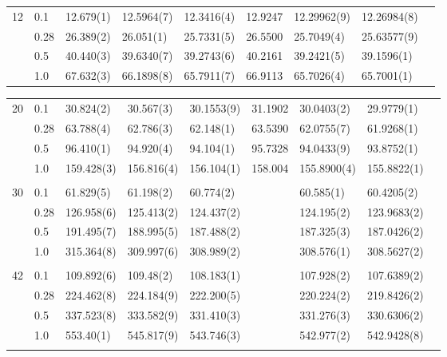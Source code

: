 {\begin{landscape}
\begin{table}
\begin{tabularx}{\hsize}{llR{2.65cm}R{2.65cm}R{2.65cm}R{2.65cm}R{2.65cm}R{2.65cm}R{2.65cm}}
				12 & 0.1 & 12.679(1) & 12.5964(7) & 12.3416(4) & 12.9247 & 12.29962(9) & 12.26984(8) \\ 
				& 0.28 & 26.389(2) & 26.051(1) & 25.7331(5) & 26.5500 & 25.7049(4) & 25.63577(9) \\
				& 0.5 & 40.440(3) & 39.6340(7) & 39.2743(6) & 40.2161 & 39.2421(5) & 39.1596(1) \\
				& 1.0 & 67.632(3) & 66.1898(8) & 65.7911(7) & 66.9113 & 65.7026(4) & 65.7001(1) \\ \hline
			\end{tabularx}
		\end{table}
		
		\begin{table}
			\label{tab:quantumdotswinteraction2D2}
			\begin{tabularx}{\hsize}{llR{2.65cm}R{2.65cm}R{2.65cm}R{2.65cm}R{2.65cm}R{2.65cm}R{2.65cm}} \\
				20 & 0.1 & 30.824(2) & 30.567(3) & 30.1553(9) & 31.1902 & 30.0403(2) & 29.9779(1) \\ 
				& 0.28 & 63.788(4) & 62.786(3) & 62.148(1) & 63.5390 & 62.0755(7) & 61.9268(1) \\
				& 0.5 & 96.410(1) & 94.920(4) & 94.104(1) & 95.7328 & 94.0433(9) & 93.8752(1) \\
				& 1.0 & 159.428(3) & 156.816(4) & 156.104(1) & 158.004 & 155.8900(4) & 155.8822(1) & \phantom{=} \\ 
				\hline \\
				
				30 & 0.1 & 61.829(5) & 61.198(2) & 60.774(2) & & 60.585(1) & 60.4205(2) \\ 
				& 0.28 & 126.958(6) & 125.413(2) & 124.437(2) & & 124.195(2) & 123.9683(2) \\
				& 0.5 & 191.495(7) & 188.995(5) & 187.488(2) & & 187.325(3) & 187.0426(2) \\
				& 1.0 & 315.364(8) & 309.997(6) & 308.989(2) & & 308.576(1) & 308.5627(2) \\ \hline \\
				
				42 & 0.1 & 109.892(6) & 109.48(2) & 108.183(1) & &  107.928(2) & 107.6389(2) \\ 
				& 0.28 & 224.462(8) & 224.184(9) & 222.200(5) & & 220.224(2) & 219.8426(2) \\
				& 0.5 & 337.523(8) & 333.582(9) & 331.410(3) & & 331.276(3) & 330.6306(2) \\
				& 1.0 & 553.40(1) & 545.817(9) & 543.746(3) & & 542.977(2) & 542.9428(8) \\ \hline \\
				

\end{tabularx}
\end{table}
\end{landscape}}

